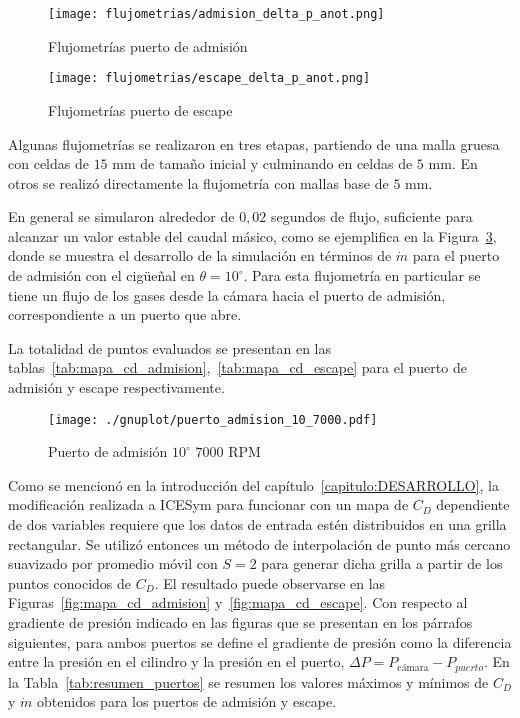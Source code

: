 \begin{figure}[h!]
  \centering
  \texttt{[image: flujometrias/admision\_delta\_p\_anot.png]}
  \caption{Flujometrías puerto de admisión}\label{fig:delta_p_admision}
\end{figure}

\begin{figure}[h!]
  \centering
  \texttt{[image: flujometrias/escape\_delta\_p\_anot.png]}
  \caption{Flujometrías puerto de escape}\label{fig:delta_p_escape}
\end{figure}


Algunas flujometrías se realizaron en tres etapas, partiendo de una malla gruesa
con celdas de $15$ mm de tamaño inicial y culminando en celdas de $5$ mm.
%
En otros se realizó directamente la flujometría con mallas base de $5$ mm.

En general se simularon alrededor de $0,02$ segundos de flujo, suficiente para
alcanzar un valor estable del caudal másico, como se ejemplifica en la
Figura~\ref{fig:adm_10_7000rpm}, donde se muestra el desarrollo de la simulación
en términos de $\dot{m}$ para el puerto de admisión con el cigüeñal en
$\theta=10^{\circ}$.
%
Para esta flujometría en particular se tiene un flujo de los gases desde la
cámara hacia el puerto de admisión, correspondiente a un puerto que abre.

%
%
La totalidad de puntos evaluados se presentan en las
tablas~\ref{tab:mapa_cd_admision},~\ref{tab:mapa_cd_escape} para el puerto de
admisión y escape respectivamente.

\begin{figure}[h]
  \centering
  \texttt{[image: ./gnuplot/puerto\_admision\_10\_7000.pdf]}
  \caption{Puerto de admisión $10^{\circ}$ \@ $7000$ RPM}\label{fig:adm_10_7000rpm}
\end{figure}

Como se mencionó en la introducción del capítulo~\ref{capitulo:DESARROLLO}, la
modificación realizada a ICESym para funcionar con un mapa de $C_{D}$
dependiente de dos variables requiere que los datos de entrada estén
distribuidos en una grilla rectangular.
%
Se utilizó entonces un método de interpolación de punto más cercano suavizado
por promedio móvil con $S=2$ para generar dicha grilla a partir de los puntos
conocidos de $C_{D}$.
%
El resultado puede observarse en las Figuras~\ref{fig:mapa_cd_admision}
y~\ref{fig:mapa_cd_escape}.
%
Con respecto al gradiente de presión indicado en las figuras que se presentan en
los párrafos siguientes, para ambos puertos se define el gradiente de presión
como la diferencia entre la presión en el cilindro y la presión en el puerto,
$\Delta P = P_{\text{c\'amara}} - P_{puerto}$.
%
En la Tabla~\ref{tab:resumen_puertos} se resumen los valores máximos y mínimos
de $C_{D}$ y $\dot{m}$ obtenidos para los puertos de admisión y escape.

